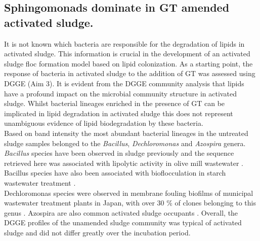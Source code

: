 \documentclass[11pt]{article}
\begin{document}
\subsection{Sphingomonads dominate in GT amended activated sludge.}
It is not known which bacteria are responsible for the degradation of lipids in activated sludge. This information is crucial in the development of an activated sludge floc formation model based on lipid colonization. As a starting point, the response of bacteria in activated sludge to the addition of GT was assessed using DGGE (Aim 3). It is evident from the DGGE community analysis that lipids have a profound impact on the microbial community structure in activated sludge. Whilst bacterial lineages enriched in the presence of GT can be implicated in lipid degradation in activated sludge this does not represent unambiguous evidence of lipid biodegradation by these bacteria.\\

Based on band intensity the most abundant bacterial lineages in the untreated sludge samples belonged to the \emph{Bacillus}, \emph{Dechloromonas} and \emph{Azospira} genera. \emph{Bacillus} species have been observed in sludge previously and the sequence retrieved here was associated with lipolytic activity in olive mill wastewater \cite{ertuugrul2007isolation}. Bacillus species have also been associated with bioflocculation in starch wastewater treatment \cite{deng2003characteristics}.\\

Dechloromonas species were observed in membrane fouling biofilms of municipal wastewater treatment plants in Japan, with over 30 \% of clones belonging to this genus \cite{miura2007membrane}. Azospira are also common activated sludge occupants \cite{tan2003dechlorosoma,reinhold2000reassessment,hunter2007azospira,wilhelmus2013microbiological}.
Overall, the DGGE profiles of the unamended sludge community was typical of activated sludge and did not differ greatly over the incubation period.\\
\end{document}
